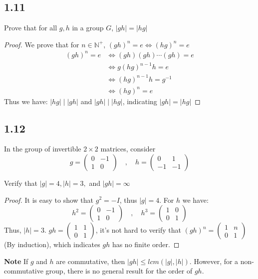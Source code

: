 \documentclass[a4paper, 12pt]{article}
\begin{document}
\subsection*{1.11} Prove that for all $g,h$ in a group $G$, $|gh| = |hg|$
\begin{proof}
  We prove that for $n\in \mathbb{N}^{+}$, $(gh)^{n}=e\Longleftrightarrow (hg)^{n}=e$
  $$
  \begin{aligned}
  (gh)^n=e  &\Longleftrightarrow (gh)(gh)\cdots(gh)=e\\
            &\Longleftrightarrow g(hg)^{n-1}h = e \\
            &\Longleftrightarrow(hg)^{n-1}h=g^{-1}\\
            &\Longleftrightarrow(hg)^n = e
  \end{aligned}
  $$
  Thus we have: $|hg| \mid |gh|$ and $|gh| \mid |hg|$, indicating $|gh| = |hg|$
\end{proof}

\subsection*{1.12}
In the group of invertible $2\times 2$ matrices, consider
$$
g = 
\begin{pmatrix}
  0 & -1\\
  1 &  0
\end{pmatrix}
\quad
,
\quad
h = 
\begin{pmatrix}
  0  & 1\\
  -1 & -1
\end{pmatrix}
$$

\noindent Verify that $|g| = 4,|h| = 3,$ and $|gh| = \infty$

\begin{proof}
  It is easy to show that $g^{2}=-I$, thus $|g| = 4$.
  For $h$ we have:
  $$
  h^2 = \begin{pmatrix}
    0 & -1\\
    1 & 0
  \end{pmatrix}\quad, \quad
  h^3 = \begin{pmatrix}
    1 & 0 \\
    0 & 1
  \end{pmatrix}
  $$
  Thus, $|h| = 3$.
  $gh = \begin{pmatrix}
    1 & 1\\
    0 & 1
  \end{pmatrix}
  $, it's not hard to verify that $(gh)^n
    = \begin{pmatrix}
      1 & n\\
      0 & 1
    \end{pmatrix}
  $(By induction), which indicates $gh$ has no finite order.
\end{proof}
\noindent \textbf{Note} If $g$ and $h$ are commutative, then $|gh|\leq lcm(|g|,|h|)$. However, for a non-commutative group, 
there is no general result for the order of $gh$.
\end{document}
